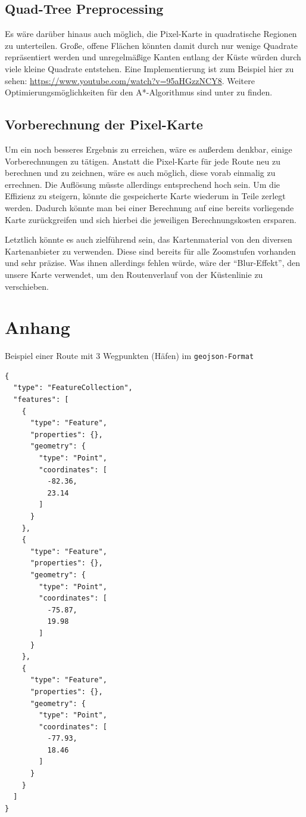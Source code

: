 \documentclass[letterpaper]{article}
\begin{document}
	\subsection{Quad-Tree Preprocessing}
		Es wäre darüber hinaus auch möglich, die Pixel-Karte in quadratische Regionen zu unterteilen. Große, offene Flächen könnten damit durch nur wenige Quadrate repräsentiert werden und unregelmäßige Kanten entlang der Küste würden durch viele kleine Quadrate entstehen. Eine Implementierung ist zum Beispiel hier zu sehen: \url{https://www.youtube.com/watch?v=95aHGzzNCY8}. Weitere Optimierungsmöglichkeiten für den A*-Algorithmus sind unter \cite{patel16} zu finden.

	\subsection{Vorberechnung der Pixel-Karte}
		Um ein noch besseres Ergebnis zu erreichen, wäre es außerdem denkbar, einige Vorberechnungen zu tätigen. Anstatt die Pixel-Karte für jede Route neu zu berechnen und zu zeichnen, wäre es auch möglich, diese vorab einmalig zu errechnen. Die Auflösung müsste allerdings entsprechend hoch sein. Um die Effizienz zu steigern, könnte die gespeicherte Karte wiederum in Teile zerlegt werden. Dadurch könnte man bei einer Berechnung auf eine bereits vorliegende Karte zurückgreifen und sich hierbei die jeweiligen Berechnungskosten ersparen.

		Letztlich könnte es auch zielführend sein, das Kartenmaterial von den diversen  Kartenanbieter zu verwenden. Diese sind bereits für alle Zoomstufen vorhanden und sehr präzise. Was ihnen allerdings fehlen würde, wäre der "`Blur-Effekt"', den unsere Karte verwendet, um den Routenverlauf von der Küstenlinie zu verschieben.


{\footnotesize 
}

\section{Anhang}
		Beispiel einer Route mit 3 Wegpunkten (Häfen) im \texttt{geojson-Format}

		\begin{lstlisting}[captionpos=b, caption=Beispiel Route: Kuba, label=lst:geojson_example, breaklines=false]
{
  "type": "FeatureCollection",
  "features": [
    {
      "type": "Feature",
      "properties": {},
      "geometry": {
        "type": "Point",
        "coordinates": [
          -82.36,
          23.14
        ]
      }
    },
    {
      "type": "Feature",
      "properties": {},
      "geometry": {
        "type": "Point",
        "coordinates": [
          -75.87,
          19.98
        ]
      }
    },
    {
      "type": "Feature",
      "properties": {},
      "geometry": {
        "type": "Point",
        "coordinates": [
          -77.93,
          18.46
        ]
      }
    }
  ]
}
		\end{lstlisting}
\end{document}
